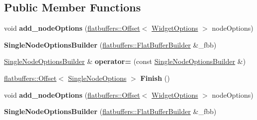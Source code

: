 \subsection*{Public Member Functions}
\begin{DoxyCompactItemize}
\item 
\mbox{\label{structflatbuffers_1_1SingleNodeOptionsBuilder_a9327ef6af6aecc4744248f71dddc5382}} 
void {\bfseries add\+\_\+node\+Options} (\hyperlink{structflatbuffers_1_1Offset}{flatbuffers\+::\+Offset}$<$ \hyperlink{structflatbuffers_1_1WidgetOptions}{Widget\+Options} $>$ node\+Options)
\item 
\mbox{\label{structflatbuffers_1_1SingleNodeOptionsBuilder_ad988a589f481a228b666922b9465098e}} 
{\bfseries Single\+Node\+Options\+Builder} (\hyperlink{classflatbuffers_1_1FlatBufferBuilder}{flatbuffers\+::\+Flat\+Buffer\+Builder} \&\+\_\+fbb)
\item 
\mbox{\label{structflatbuffers_1_1SingleNodeOptionsBuilder_a2b28ee1e21fda09445a23ff24e6902f9}} 
\hyperlink{structflatbuffers_1_1SingleNodeOptionsBuilder}{Single\+Node\+Options\+Builder} \& {\bfseries operator=} (const \hyperlink{structflatbuffers_1_1SingleNodeOptionsBuilder}{Single\+Node\+Options\+Builder} \&)
\item 
\mbox{\label{structflatbuffers_1_1SingleNodeOptionsBuilder_ad78c5e258aaaac122c73d9cce2efd057}} 
\hyperlink{structflatbuffers_1_1Offset}{flatbuffers\+::\+Offset}$<$ \hyperlink{structflatbuffers_1_1SingleNodeOptions}{Single\+Node\+Options} $>$ {\bfseries Finish} ()
\item 
\mbox{\label{structflatbuffers_1_1SingleNodeOptionsBuilder_a9327ef6af6aecc4744248f71dddc5382}} 
void {\bfseries add\+\_\+node\+Options} (\hyperlink{structflatbuffers_1_1Offset}{flatbuffers\+::\+Offset}$<$ \hyperlink{structflatbuffers_1_1WidgetOptions}{Widget\+Options} $>$ node\+Options)
\item 
\mbox{\label{structflatbuffers_1_1SingleNodeOptionsBuilder_ad988a589f481a228b666922b9465098e}} 
{\bfseries Single\+Node\+Options\+Builder} (\hyperlink{classflatbuffers_1_1FlatBufferBuilder}{flatbuffers\+::\+Flat\+Buffer\+Builder} \&\+\_\+fbb)

\end{DoxyCompactItemize}
